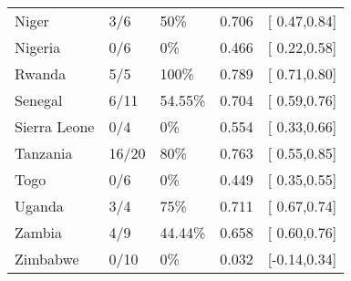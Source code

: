 \begin{table}[ht]
\begin{tabular}{lllrl}
  Niger & 3/6 & 50\% & 0.706 & [ 0.47,0.84] \\ 
  Nigeria & 0/6 & 0\% & 0.466 & [ 0.22,0.58] \\ 
  Rwanda & 5/5 & 100\% & 0.789 & [ 0.71,0.80] \\ 
  Senegal & 6/11 & 54.55\% & 0.704 & [ 0.59,0.76] \\ 
  Sierra Leone & 0/4 & 0\% & 0.554 & [ 0.33,0.66] \\ 
  Tanzania & 16/20 & 80\% & 0.763 & [ 0.55,0.85] \\ 
  Togo & 0/6 & 0\% & 0.449 & [ 0.35,0.55] \\ 
  Uganda & 3/4 & 75\% & 0.711 & [ 0.67,0.74] \\ 
  Zambia & 4/9 & 44.44\% & 0.658 & [ 0.60,0.76] \\ 
  Zimbabwe & 0/10 & 0\% & 0.032 & [-0.14,0.34] \\ 
   \hline
\end{tabular}
\end{table}
